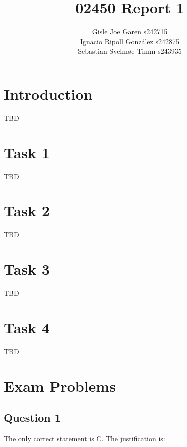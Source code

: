 \documentclass[twoside,11pt]{article}
\begin{document}
\title{02450 Report 1}

\author{
	\name Gisle Joe Garen \email s242715 \\
	\AND
	\name Ignacio Ripoll González \email s242875 \\
	\AND
	\name Sebastian Svelmøe Timm \email s243935 \\
}


\maketitle

\section*{Introduction}

TBD

\section*{Task 1}

TBD

\section*{Task 2}

TBD

\section*{Task 3}

TBD

\section*{Task 4}

TBD

\section*{Exam Problems}

\subsection*{Question 1}

The only correct statement is C. The justification is:
\end{document}
